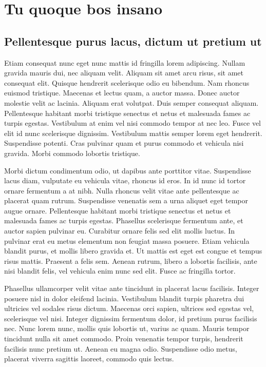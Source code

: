 \appendix


\chapter{Tu quoque bos insano}


\section{Pellentesque purus lacus, dictum ut pretium ut}

Etiam consequat nunc eget nunc mattis id fringilla lorem adipiscing. Nullam gravida mauris dui, nec aliquam velit. Aliquam sit amet arcu risus, sit amet consequat elit. Quisque hendrerit scelerisque odio eu bibendum. Nam rhoncus euismod tristique. Maecenas et lectus quam, a auctor massa. Donec auctor molestie velit ac lacinia. Aliquam erat volutpat. Duis semper consequat aliquam. Pellentesque habitant morbi tristique senectus et netus et malesuada fames ac turpis egestas. Vestibulum at enim vel nisi commodo tempor at nec leo. Fusce vel elit id nunc scelerisque dignissim. Vestibulum mattis semper lorem eget hendrerit. Suspendisse potenti. Cras pulvinar quam et purus commodo et vehicula nisi gravida. Morbi commodo lobortis tristique.

Morbi dictum condimentum odio, ut dapibus ante porttitor vitae. Suspendisse lacus diam, vulputate eu vehicula vitae, rhoncus id eros. In id nunc id tortor ornare fermentum a at nibh. Nulla rhoncus velit vitae ante pellentesque ac placerat quam rutrum. Suspendisse venenatis sem a urna aliquet eget tempor augue ornare. Pellentesque habitant morbi tristique senectus et netus et malesuada fames ac turpis egestas. Phasellus scelerisque fermentum ante, et auctor sapien pulvinar eu. Curabitur ornare felis sed elit mollis luctus. In pulvinar erat eu metus elementum non feugiat massa posuere. Etiam vehicula blandit purus, et mollis libero gravida et. Ut mattis est eget est congue et tempus risus mattis. Praesent a felis sem. Aenean rutrum, libero a lobortis facilisis, ante nisi blandit felis, vel vehicula enim nunc sed elit. Fusce ac fringilla tortor.

Phasellus ullamcorper velit vitae ante tincidunt in placerat lacus facilisis. Integer posuere nisl in dolor eleifend lacinia. Vestibulum blandit turpis pharetra dui ultricies vel sodales risus dictum. Maecenas orci sapien, ultrices sed egestas vel, scelerisque vel nisi. Integer dignissim fermentum dolor, id pretium purus facilisis nec. Nunc lorem nunc, mollis quis lobortis ut, varius ac quam. Mauris tempor tincidunt nulla sit amet commodo. Proin venenatis tempor turpis, hendrerit facilisis nunc pretium ut. Aenean eu magna odio. Suspendisse odio metus, placerat viverra sagittis laoreet, commodo quis lectus.


